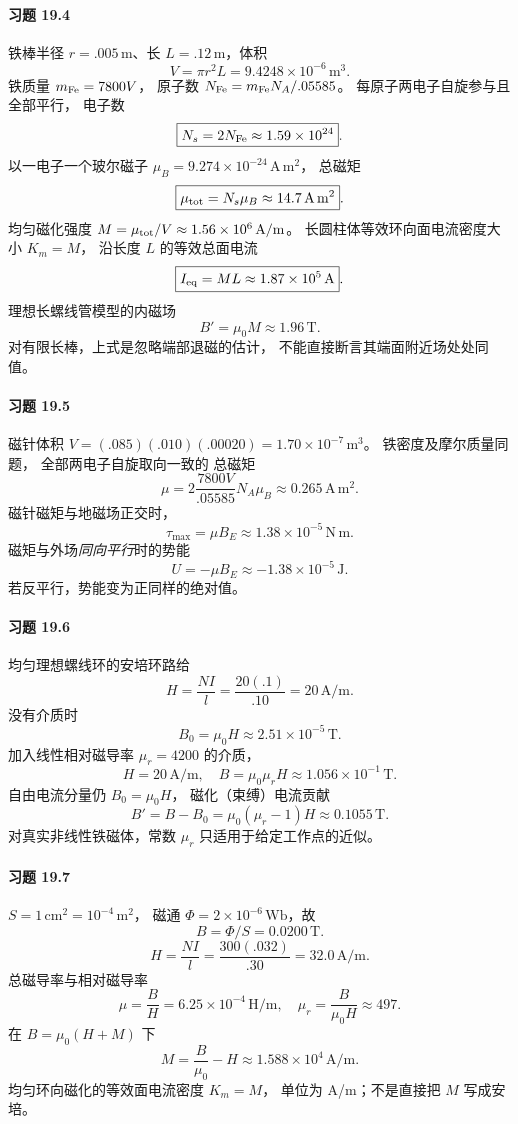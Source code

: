 \paragraph{习题 19.4}
铁棒半径 \(r=.005\,\mathrm m\)、长
\(L=.12\,\mathrm m\)，体积
\[
 V=\pi r^2L=9.4248\times10^{-6}\,\mathrm{m^3}.
\]
铁质量 \(m_{\rm Fe}=7800V\)，
原子数
\(N_{\rm Fe}=m_{\rm Fe}N_A/.05585\)。
每原子两电子自旋参与且全部平行，
电子数
\[
 \boxed{N_s=2N_{\rm Fe}
 \approx1.59\times10^{24}}.
\]
以一电子一个玻尔磁子
\(\mu_B=9.274\times10^{-24}\,\mathrm{A\,m^2}\)，
总磁矩
\[
 \boxed{\mu_{\rm tot}=N_s\mu_B
 \approx14.7\,\mathrm{A\,m^2}}.
\]
均匀磁化强度 \(M=\mu_{\rm tot}/V
 \approx1.56\times10^6\,\mathrm{A/m}\)。
长圆柱体等效环向面电流密度大小
\(K_m=M\)，
沿长度 \(L\) 的等效总面电流
\[
 \boxed{I_{\rm eq}=ML\approx1.87\times10^5\,\mathrm A}.
\]
理想长螺线管模型的内磁场
\[
 \boxed{B'=\mu_0M\approx1.96\,\mathrm T}.
\]
对有限长棒，上式是忽略端部退磁的估计，
不能直接断言其端面附近场处处同值。

\paragraph{习题 19.5}
磁针体积
\(V=(.085)(.010)(.00020)
 =1.70\times10^{-7}\,\mathrm{m^3}\)。
铁密度及摩尔质量同题，
全部两电子自旋取向一致的
总磁矩
\[
 \boxed{\mu=2\frac{7800V}{.05585}N_A\mu_B
 \approx0.265\,\mathrm{A\,m^2}}.
\]
磁针磁矩与地磁场正交时，
\[
 \boxed{\tau_{\max}=\mu B_E
 \approx1.38\times10^{-5}\,\mathrm{N\,m}}.
\]
磁矩与外场\emph{同向平行}时的势能
\[
 \boxed{U=-\mu B_E
 \approx-1.38\times10^{-5}\,\mathrm J}.
\]
若反平行，势能变为正同样的绝对值。

\paragraph{习题 19.6}
均匀理想螺线环的安培环路给
\[
 \boxed{H=\frac{NI}l=\frac{20(.1)}{.10}
 =20\,\mathrm{A/m}}.
\]
没有介质时
\[
 \boxed{B_0=\mu_0H
 \approx2.51\times10^{-5}\,\mathrm T}.
\]
加入线性相对磁导率
\(\mu_r=4200\) 的介质，
\[
 \boxed{H=20\,\mathrm{A/m}},\quad
 \boxed{B=\mu_0\mu_rH
 \approx1.056\times10^{-1}\,\mathrm T}.
\]
自由电流分量仍
\(B_0=\mu_0H\)，
磁化（束缚）电流贡献
\[
 \boxed{B'=B-B_0
 =\mu_0(\mu_r-1)H
 \approx0.1055\,\mathrm T}.
\]
对真实非线性铁磁体，常数 \(\mu_r\)
只适用于给定工作点的近似。

\paragraph{习题 19.7}
\(S=1\,\mathrm{cm^2}=10^{-4}\,\mathrm{m^2}\)，
磁通 \(\Phi=2\times10^{-6}\,\mathrm{Wb}\)，故
\[
 \boxed{B=\Phi/S=0.0200\,\mathrm T}.
\]
\[
 \boxed{H=\frac{NI}{l}
 =\frac{300(.032)}{.30}=32.0\,\mathrm{A/m}}.
\]
总磁导率与相对磁导率
\[
 \boxed{\mu=\frac BH
 =6.25\times10^{-4}\,\mathrm{H/m}},
\quad
 \boxed{\mu_r=\frac B{\mu_0H}
 \approx497}.
\]
在 \(B=\mu_0(H+M)\) 下
\[
 \boxed{M=\frac B{\mu_0}-H
 \approx1.588\times10^4\,\mathrm{A/m}}.
\]
均匀环向磁化的等效面电流密度
\(\boxed{K_m=M}\)，
单位为 A/m；不是直接把 \(M\) 写成安培。

